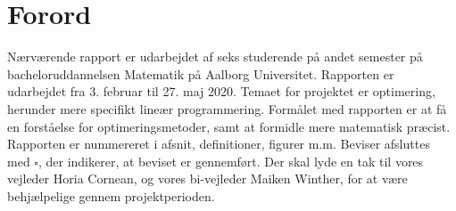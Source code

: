 \chapter*{Forord}
Nærværende rapport er udarbejdet af seks studerende på andet semester  på bacheloruddannelsen Matematik på Aalborg Universitet. 
Rapporten er udarbejdet fra 3. februar til 27. maj 2020.
% 
Temaet for projektet er optimering, herunder mere specifikt lineær programmering.
%
Formålet med rapporten er at få en forståelse for optimeringsmetoder, samt at formidle mere matematisk præcist.
% 	
Rapporten er nummereret i afsnit, definitioner, figurer m.m.
Beviser afsluttes med $\square$, der indikerer, at beviset er gennemført.
%
Der skal lyde en tak til vores vejleder Horia Cornean, og vores bi-vejleder Maiken Winther, for at være behjælpelige gennem projektperioden.
%
\\\\
